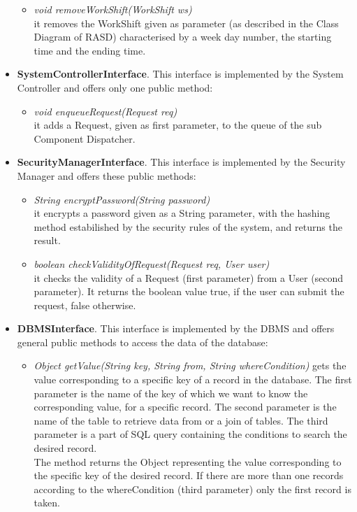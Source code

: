 \documentclass[\mainpath/main]{subfiles}
\begin{document}
\begin{itemize}
\begin{itemize}
		\item \textit{void removeWorkShift(WorkShift ws)}\\
		it removes the WorkShift given as parameter (as described in the Class Diagram of RASD) characterised by a week day number, the starting time and the ending time. \\
	\end{itemize}
					
					
	\item \textbf{SystemControllerInterface}. This interface is implemented by the System Controller and offers only one public method:
	\begin{itemize}
		\item \textit{void enqueueRequest(Request req)}\\
		it adds a Request, given as first parameter, to the queue of the sub Component Dispatcher. \\
	\end{itemize}
	
	\item \textbf{SecurityManagerInterface}. This interface is implemented by the Security Manager and offers these public methods:
	\begin{itemize}
		\item \textit{String encryptPassword(String password)}\\
		it encrypts a password given as a String parameter, with the hashing method estabilished by the security rules of the system, and returns the result.
		\item \textit{boolean checkValidityOfRequest(Request req, User user)}\\
		it checks the validity of a Request (first parameter) from a User (second parameter). It returns the boolean value true, if the user can submit the request, false otherwise. \\
	\end{itemize}	
	
	\item \textbf{DBMSInterface}. This interface is implemented by the DBMS and offers general public methods to access the data of the database:
	\begin{itemize}
		\item \textit{Object getValue(String key, String from, String whereCondition)}
		gets the value corresponding to a specific key of a record in the database. The first parameter is the name of the key of which we want to know the corresponding value, for a specific record. The second parameter is the name of the table to retrieve data from or a join of tables. The third parameter is a part of SQL query containing the conditions to search the desired record.\\
		The method returns the Object representing the value corresponding to the specific key of the desired record. If there are more than one records according to the whereCondition (third parameter) only the first record is taken.
		

\end{itemize}
\end{itemize}
\end{document}
